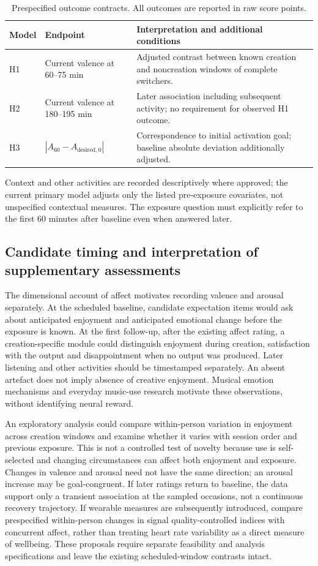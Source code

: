 \documentclass[11pt]{article}
\begin{document}
\begin{table}[htbp]
\centering\small
\caption{Prespecified outcome contracts. All outcomes are reported in raw score points.}
\label{tab:outcome-contract}
\begin{tabularx}{\linewidth}{@{}p{.12\linewidth}p{.29\linewidth}X@{}}
\toprule
Model & Endpoint & Interpretation and additional conditions \\
\midrule
H1 & Current valence at 60--75 min & Adjusted contrast between known creation and noncreation windows of complete switchers. \\
H2 & Current valence at 180--195 min & Later association including subsequent activity; no requirement for observed H1 outcome. \\
H3 & $|A_{60}-A_{\mathrm{desired},0}|$ & Correspondence to initial activation goal; baseline absolute deviation additionally adjusted. \\
\bottomrule
\end{tabularx}
\end{table}
Context and other activities are recorded descriptively where approved; the current primary model adjusts only the listed pre-exposure covariates, not unspecified contextual measures. The exposure question must explicitly refer to the first 60 minutes after baseline even when answered later.
\subsection{Candidate timing and interpretation of supplementary assessments}
The dimensional account of affect \citep{russell1980} motivates recording valence and arousal separately. At the scheduled baseline, candidate expectation items would ask about anticipated enjoyment and anticipated emotional change before the exposure is known. At the first follow-up, after the existing affect rating, a creation-specific module could distinguish enjoyment during creation, satisfaction with the output and disappointment when no output was produced. Later listening and other activities should be timestamped separately. An absent artefact does not imply absence of creative enjoyment. Musical emotion mechanisms \citep{juslin2008} and everyday music-use research \citep{randall2017} motivate these observations, without identifying neural reward.

An exploratory analysis could compare within-person variation in enjoyment across creation windows and examine whether it varies with session order and previous exposure. This is not a controlled test of novelty because use is self-selected and changing circumstances can affect both enjoyment and exposure. Changes in valence and arousal need not have the same direction; an arousal increase may be goal-congruent. If later ratings return to baseline, the data support only a transient association at the sampled occasions, not a continuous recovery trajectory. If wearable measures are subsequently introduced, compare prespecified within-person changes in signal quality-controlled indices with concurrent affect, rather than treating heart rate variability as a direct measure of wellbeing. These proposals require separate feasibility and analysis specifications and leave the existing scheduled-window contrasts intact.
\end{document}
